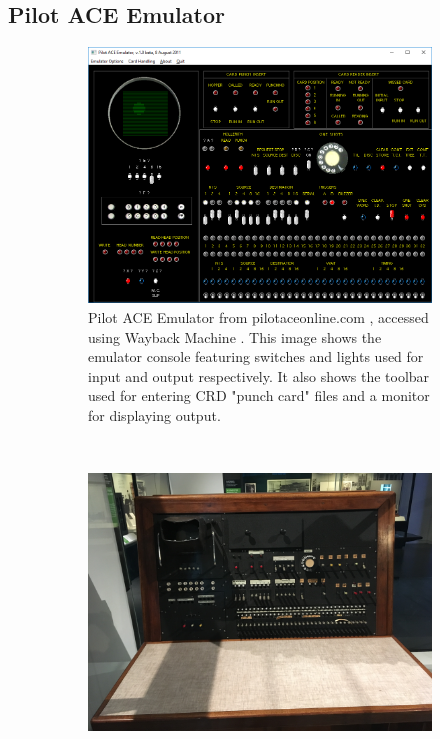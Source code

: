 \documentclass{l4proj}
\begin{document}
\subsection{Pilot ACE Emulator} 
\begin{figure}[h]
	\centering
	\begin{subfigure}[t]{0.45\textwidth}
		\includegraphics[width=\textwidth]{images/ace-emulator}
		\caption{Pilot ACE Emulator from pilotaceonline.com \citep{Ace12}, accessed using Wayback Machine \citep{Wayback19}. This image shows the emulator console featuring switches and lights used for input and output respectively. It also shows the toolbar used for entering CRD "punch card" files and a monitor for displaying output.}
		\label{fig:ace-emu}
	\end{subfigure}
	\quad
	~ %
	\begin{subfigure}[t]{0.45\textwidth}
		\includegraphics[width=\textwidth]{images/real-ace}

\end{subfigure}
\end{figure}
\end{document}
